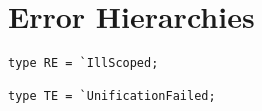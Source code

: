 \documentclass{article}
\begin{document}







\section{Error Hierarchies}

\begin{verbatim}
type RE = `IllScoped;

type TE = `UnificationFailed;
\end{verbatim}




\end{document}
